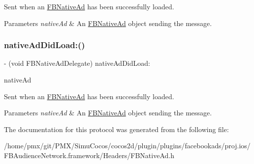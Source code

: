 Sent when an \hyperlink{interfaceFBNativeAd}{F\+B\+Native\+Ad} has been successfully loaded.


\begin{DoxyParams}{Parameters}
{\em native\+Ad} & An \hyperlink{interfaceFBNativeAd}{F\+B\+Native\+Ad} object sending the message. \\
\hline
\end{DoxyParams}
\mbox{\label{protocolFBNativeAdDelegate_01-p_abad2ba96d5837eee4c2c7f88e216a9f5}} 
\subsubsection{\texorpdfstring{native\+Ad\+Did\+Load\+:()}{nativeAdDidLoad:()}\hspace{0.1cm}{\footnotesize\ttfamily [5/5]}}
{\footnotesize\ttfamily -\/ (void F\+B\+Native\+Ad\+Delegate) native\+Ad\+Did\+Load\+: \begin{DoxyParamCaption}\item[{(\hyperlink{interfaceFBNativeAd}{F\+B\+Native\+Ad} $\ast$)}]{native\+Ad }\end{DoxyParamCaption}}

Sent when an \hyperlink{interfaceFBNativeAd}{F\+B\+Native\+Ad} has been successfully loaded.


\begin{DoxyParams}{Parameters}
{\em native\+Ad} & An \hyperlink{interfaceFBNativeAd}{F\+B\+Native\+Ad} object sending the message. \\
\hline
\end{DoxyParams}


The documentation for this protocol was generated from the following file\+:\begin{DoxyCompactItemize}
\item 
/home/pmx/git/\+P\+M\+X/\+Simu\+Cocos/cocos2d/plugin/plugins/facebookads/proj.\+ios/\+F\+B\+Audience\+Network.\+framework/\+Headers/F\+B\+Native\+Ad.\+h\end{DoxyCompactItemize}
